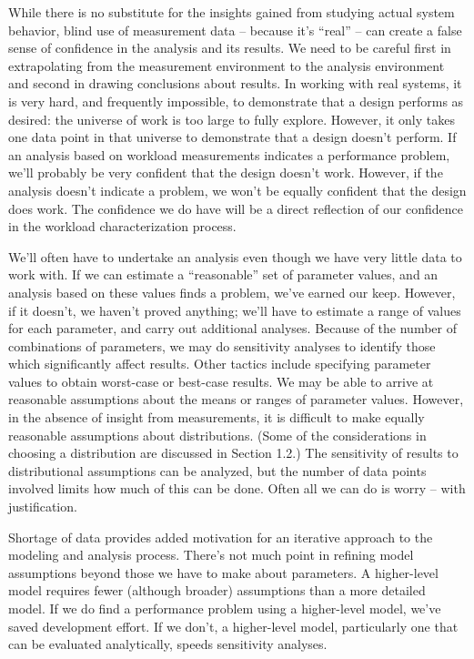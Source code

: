 While there is no substitute for the insights gained from studying actual
system behavior, blind use of measurement data -- because it's ``real'' -- can
create a false sense of confidence in the analysis and its results. We need to
be careful first in extrapolating from the measurement environment to the
analysis environment and second in drawing conclusions about results. In
working with real systems, it is very hard, and frequently impossible, to
demonstrate that a design performs as desired: the universe of work is too
large to fully explore. However, it only takes one data point in that universe
to demonstrate that a design doesn't perform. If an analysis based on workload
measurements indicates a performance problem, we'll probably be very confident
that the design doesn't work. However, if the analysis doesn't indicate a
problem, we won't be equally confident that the design does work. The
confidence we do have will be a direct reflection of our confidence in the
workload characterization process.

We'll often have to undertake an analysis even though we have very little data
 to work with. If we can estimate a ``reasonable'' set of parameter values, and
an analysis based on these values finds a problem, we've earned our keep.
However, if it doesn't, we haven't proved anything; we'll have to estimate a
range of values for each parameter, and carry out additional analyses. Because
of the number of combinations of parameters, we may do sensitivity analyses
 to identify those which significantly affect results. Other tactics include
specifying parameter values to obtain worst-case or best-case results. We may
be able to arrive at reasonable assumptions about the means or ranges of
parameter values. However, in the absence of insight from measurements, it is
difficult to make equally reasonable assumptions about distributions. (Some
of the considerations in choosing a distribution are discussed in Section
1.2.) The sensitivity of results to distributional assumptions can be
analyzed, but the number of data points involved limits how much of this can
be done. Often all we can do is worry -- with justification.

Shortage of data provides added motivation for an iterative approach to the
modeling and analysis process. There's not much point in refining model
assumptions beyond those we have to make about parameters. A higher-level
model requires fewer (although broader) assumptions than a more detailed
model. If we do find a performance problem using a higher-level model, we've
saved development effort. If we don't, a higher-level model, particularly one
that can be evaluated analytically, speeds sensitivity analyses.

